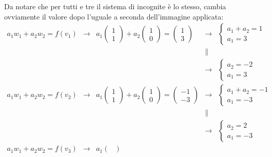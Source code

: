 \documentclass[a4paper]{article}
\begin{document}
	\noindent
	Da notare che per tutti e tre il sistema di incognite è lo stesso, cambia ovviamente il valore dopo l'uguale a seconda dell'immagine applicata:
	\begin{equation*}
		\begin{array}{lllll}
			a_{1}w_{1} + a_{2}w_{2} = f\left(v_{1}\right) &\rightarrow& a_{1}\begin{pmatrix}
				1 \\ 1
			\end{pmatrix} + a_{2}\begin{pmatrix}
				1 \\ 0
			\end{pmatrix} = \begin{pmatrix}
				1 \\ 3
			\end{pmatrix} &\rightarrow& \begin{cases}
				a_{1} + a_{2} = 1 \\
				a_{1} = 3
			\end{cases} \\
			&& &\parallel& \\
			&& &\rightarrow& \begin{cases}
				a_{2} = -2 \\
				a_{1} = 3
			\end{cases}\\ [1.8em]
			a_{1}w_{1} + a_{2}w_{2} = f\left(v_{2}\right) &\rightarrow& a_{1}\begin{pmatrix}
				1 \\ 1
			\end{pmatrix} + a_{2}\begin{pmatrix}
				1 \\ 0
			\end{pmatrix} = \begin{pmatrix}
				-1 \\ -3
			\end{pmatrix} &\rightarrow& \begin{cases}
				a_{1} + a_{2} = -1 \\
				a_{1} = -3
			\end{cases} \\
			&& &\parallel& \\
			&& &\rightarrow& \begin{cases}
				a_{2} = 2 \\
				a_{1} = -3
			\end{cases} \\ [1.8em]
			a_{1}w_{1} + a_{2}w_{2} = f\left(v_{3}\right) &\rightarrow& a_{1}\begin{pmatrix}

\end{pmatrix}
\end{array}
\end{equation*}
\end{document}
